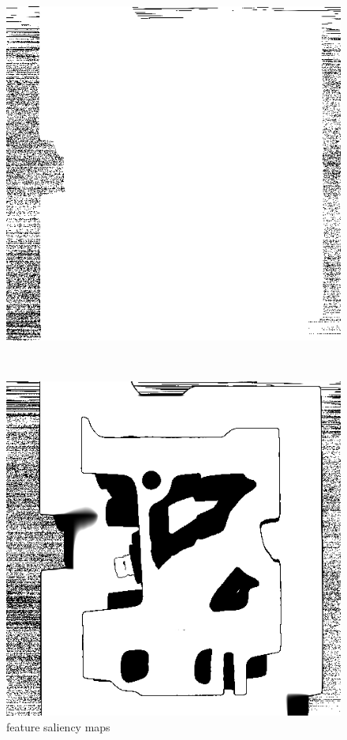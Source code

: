 \begin{figure}
	\centering
	\begin{minipage}{.33\textwidth}
		\includegraphics[width=1\linewidth]{images/engine_naive_saliencemap_1}
		\subcaption{}
	\end{minipage}~
	\begin{minipage}{.33\textwidth}
		\includegraphics[width=1\linewidth]{images/engine_naive_saliencemap_2}
		\subcaption{}
	\end{minipage}
	\caption{feature saliency maps}
	\label{fig:engine_naive_saliencemap_features}
\end{figure}

